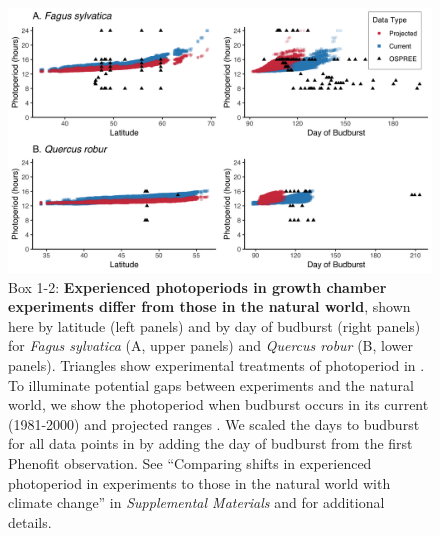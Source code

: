\documentclass{article}
\begin{document}
\begin{figure}[h]
\includegraphics{..//..//analyses/photoperiod/figures/2D_actual_combined.png} 
\caption{Box 1-2: \textbf{Experienced photoperiods in growth chamber experiments differ from those in the natural world}, shown here by latitude (left panels) and by day of budburst (right panels) for \emph{Fagus sylvatica} (A, upper panels) and \emph{Quercus robur} (B, lower panels). Triangles show experimental treatments of photoperiod in \citet{wolkovich2019}. To illuminate potential gaps between experiments and the natural world, we show the photoperiod when budburst occurs in its current (1981-2000) and projected ranges \citep[2081-2100, using the A1Fi Phenofit scenario, see][]{duputie2015}. We scaled the days to budburst for all data points in \citet{wolkovich2019} by adding the day of budburst from the first Phenofit observation. See ``Comparing shifts in experienced photoperiod in experiments to those in the natural world with climate change'' in \emph{Supplemental Materials} and \citet{duputie2015} for additional details.} 
 \label{fig:fagus}
 \end{figure}
 
\clearpage 
\end{document}
